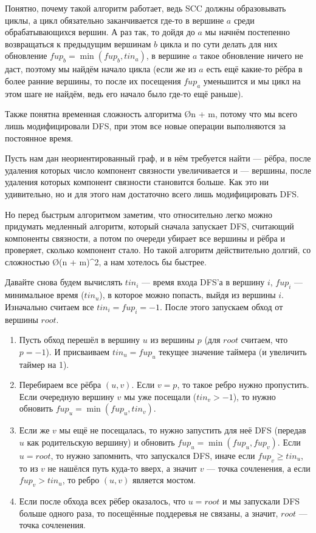 Понятно, почему такой алгоритм работает, ведь SCC должны образовывать циклы, а цикл обязательно заканчивается где-то в вершине $a$ среди обрабатывающихся вершин. А раз так, то дойдя до $a$ мы начнём постепенно возвращаться к предыдущим вершинам $b$ цикла и по сути делать для них обновление $fup_b = \min(fup_b, tin_a)$, в вершине $a$ такое обновление ничего не даст, поэтому мы найдём начало цикла (если же из $a$ есть ещё какие-то рёбра в более ранние вершины, то после их посещения $fup_a$ уменьшится и мы цикл на этом шаге не найдём, ведь его начало было где-то ещё раньше).

Также понятна временная сложность алгоритма \O{n + m}, потому что мы всего лишь модифицировали DFS, при этом все новые операции выполняются за постоянное время.


Пусть нам дан неориентированный граф, и в нём требуется найти  — рёбра, после удаления которых число компонент связности увеличивается и  — вершины, после удаления которых компонент связности становится больше. Как это ни удивительно, но и для этого нам достаточно всего лишь модифицировать DFS.

Но перед быстрым алгоритмом заметим, что относительно легко можно придумать медленный алгоритм, который сначала запускает DFS, считающий компоненты связности, а потом по очереди убирает все вершины и рёбра и проверяет, сколько компонент стало. Но такой алгоритм действительно долгий, со сложностью \O{(n + m)^2}, а нам хотелось бы быстрее.

Давайте снова будем вычислять $tin_i$ — время входа DFS'а в вершину $i$, $fup_i$ — минимальное время ($tin_u$), в которое можно попасть, выйдя из вершины $i$. Изначально считаем все $tin_i = fup_i = -1$. После этого запускаем обход от вершины $root$.

\begin{enumerate}
    \item Пусть обход перешёл в вершину $u$ из вершины $p$ (для $root$ считаем, что $p = -1$). И присваиваем $tin_u = fup_u$ текущее значение таймера (и увеличить таймер на 1).
     \item Перебираем все рёбра $(u, v)$. Если $v = p$, то такое ребро нужно пропустить. Если очередную вершину $v$ мы уже посещали ($tin_v > -1$), то нужно обновить $fup_u = \min(fup_u, tin_v)$.
     \item Если же $v$ мы ещё не посещалась, то нужно запустить для неё DFS (передав $u$ как родительскую вершину) и обновить $fup_u = \min (fup_u, fup_v)$. Если $u = root$, то нужно запомнить, что запускался DFS, иначе если $fup_v \geq tin_u$, то из $v$ не нашёлся путь куда-то вверх, а значит $v$ — точка сочленения, а если $fup_v > tin_u$, то ребро $(u, v)$ является мостом.
     \item Если после обхода всех рёбер оказалось, что $u = root$ и мы запускали DFS больше одного раза, то посещённые поддеревья не связаны, а значит, $root$ — точка сочленения.
\end{enumerate}

